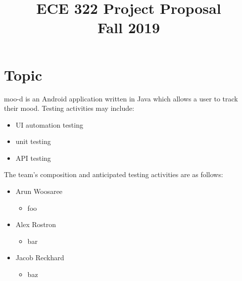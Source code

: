 \documentclass[letterpaper]{article}
\title{ECE 322 Project Proposal\\
 Fall 2019}
\begin{document}
\maketitle %

\section{Topic}
moo-d 
is an Android application written in Java which allows a user to
track their mood. Testing activities may include:
\begin{itemize}
	\item UI automation testing
	\item unit testing
	\item API testing
\end{itemize}


The team's composition and anticipated testing activities are as follows:

\begin{itemize}
	\item Arun Woosaree \begin{itemize}
				\item foo
                            \end{itemize}
	\item Alex Rostron \begin{itemize}
				\item bar
			   \end{itemize}
	\item Jacob Reckhard \begin{itemize}
				\item baz
			     \end{itemize}
\end{itemize}
\end{document}

